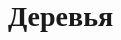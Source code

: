 \documentclass[aspectratio=169
  , xcolor={svgnames}
  , hyperref=
      { colorlinks
      , urlcolor=DarkBlue
      }
  , russian  %
  ]{beamer}
\theoremstyle{exerciseStyle1}
\begin{document}
\section{Деревья}

\end{document}
